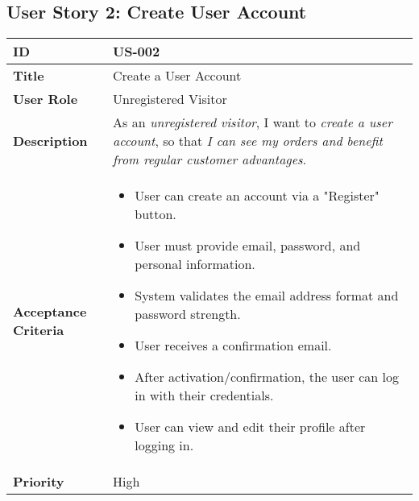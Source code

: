 \documentclass[a4paper,11pt]{article}
\begin{document}
\subsection{User Story 2: Create User Account}
\begin{tabularx}{\textwidth}{|l|X|}
\hline
\textbf{ID} & US-002 \\
\hline
\textbf{Title} & Create a User Account \\
\hline
\textbf{User Role} & Unregistered Visitor \\
\hline
\textbf{Description} & As an \textit{unregistered visitor}, I want to \textit{create a user account}, so that \textit{I can see my orders and benefit from regular customer advantages}. \\
\hline
\textbf{Acceptance Criteria} &
\begin{itemize}[noitemsep, topsep=0pt]
    \item User can create an account via a "Register" button.
    \item User must provide email, password, and personal information.
    \item System validates the email address format and password strength.
    \item User receives a confirmation email.
    \item After activation/confirmation, the user can log in with their credentials.
    \item User can view and edit their profile after logging in.
\end{itemize} \\
\hline
\textbf{Priority} & High \\
\hline
\end{tabularx}
\end{document}
